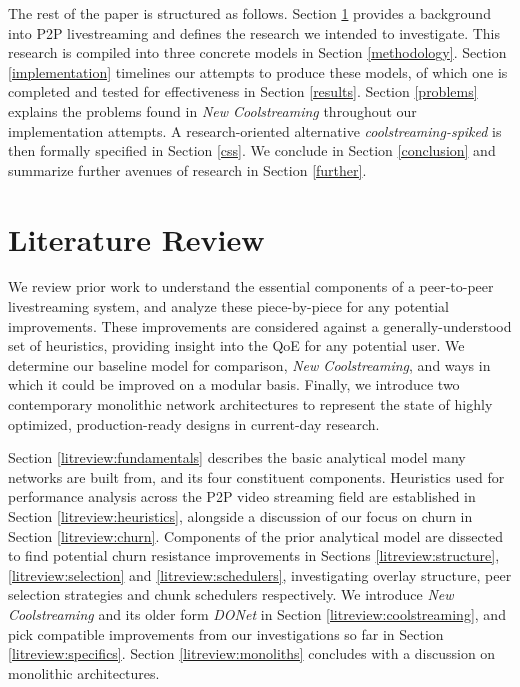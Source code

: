 \documentclass[12pt,a4paper]{article}
\begin{document}
The rest of the paper is structured as follows. Section \ref{litreview} provides a background into P2P livestreaming and defines the research we intended to investigate. This research is compiled into three concrete models in Section \ref{methodology}. Section \ref{implementation} timelines our attempts to produce these models, of which one is completed and tested for effectiveness in Section \ref{results}. Section \ref{problems} explains the problems found in \textit{New Coolstreaming} throughout our implementation attempts. A research-oriented alternative \textit{coolstreaming-spiked} is then formally specified in Section \ref{css}. We conclude in Section \ref{conclusion} and summarize further avenues of research in Section \ref{further}.

\section{Literature Review}  \label{litreview}
We review prior work to understand the essential components of a peer-to-peer livestreaming system, and analyze these piece-by-piece for any potential improvements. These improvements are considered against a generally-understood set of heuristics, providing insight into the QoE for any potential user. We determine our baseline model for comparison, \textit{New Coolstreaming}, and ways in which it could be improved on a modular basis. Finally, we introduce two contemporary monolithic network architectures to represent the state of highly optimized, production-ready designs in current-day research.

Section \ref{litreview:fundamentals} describes the basic analytical model many networks are built from, and its four constituent components. Heuristics used for performance analysis across the P2P video streaming field are established in Section \ref{litreview:heuristics}, alongside a discussion of our focus on churn in Section \ref{litreview:churn}. Components of the prior analytical model are dissected to find potential churn resistance improvements in Sections \ref{litreview:structure}, \ref{litreview:selection} and \ref{litreview:schedulers}, investigating overlay structure, peer selection strategies and chunk schedulers respectively. We introduce \textit{New Coolstreaming} and its older form \textit{DONet} in Section \ref{litreview:coolstreaming}, and pick compatible improvements from our investigations so far in Section \ref{litreview:specifics}. Section \ref{litreview:monoliths} concludes with a discussion on monolithic architectures.
\end{document}
